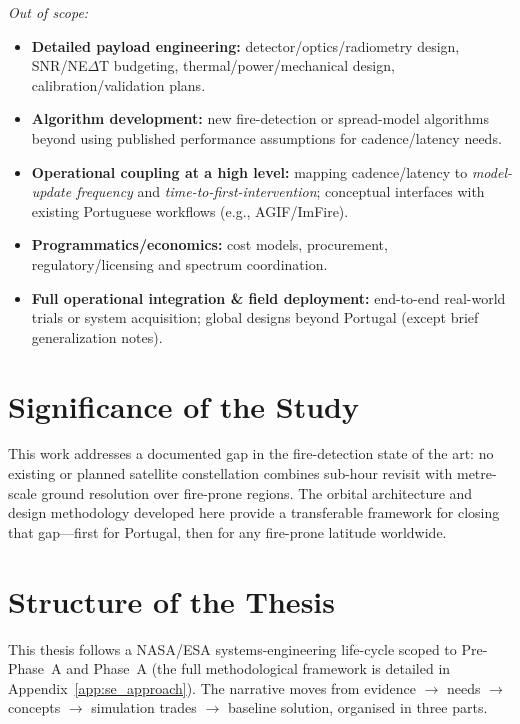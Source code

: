 \emph{Out of scope:}

\begin{itemize}
	\item
	      \textbf{Detailed payload engineering:} detector/optics/radiometry
	      design, SNR/NE$\Delta$T budgeting, thermal/power/mechanical design,
	      calibration/validation plans.
	\item
	      \textbf{Algorithm development:} new fire-detection or spread-model
	      algorithms beyond using published performance assumptions for
	      cadence/latency needs.
	\item
	      \textbf{Operational coupling at a high level:} mapping cadence/latency
	      to \emph{model-update frequency} and
	      \emph{time-to-first-intervention}; conceptual interfaces with
	      existing Portuguese workflows (e.g., AGIF/ImFire).
	\item
	      \textbf{Programmatics/economics:} cost models, procurement,
	      regulatory/licensing and spectrum coordination.
	\item
	      \textbf{Full operational integration \& field deployment:} end-to-end
	      real-world trials or system acquisition; global designs beyond
	      Portugal (except brief generalization notes).
\end{itemize}


\section{Significance of the Study}\label{sec:significance}

This work addresses a documented gap in the fire-detection state of the art: no existing or planned satellite constellation combines sub-hour revisit with metre-scale ground resolution over fire-prone regions.
The orbital architecture and design methodology developed here provide a transferable framework for closing that gap---first for Portugal, then for any fire-prone latitude worldwide.

\section{Structure of the Thesis}\label{sec:structure}

This thesis follows a NASA/ESA systems-engineering life-cycle scoped to Pre-Phase~A and Phase~A (the full methodological framework is detailed in Appendix~\ref{app:se_approach}). The narrative moves from evidence $\rightarrow$ needs $\rightarrow$ concepts $\rightarrow$ simulation trades $\rightarrow$ baseline solution, organised in three parts.


